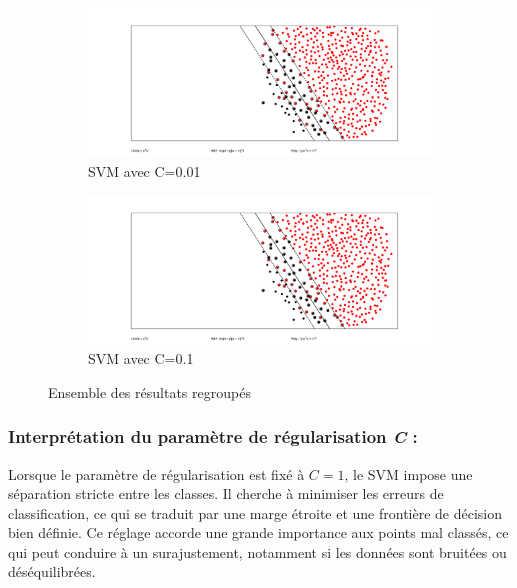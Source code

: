 \documentclass[12pt,a4paper]{report}
\begin{document}
\begin{figure}[H]
    \begin{subfigure}{0.45\linewidth}
        \centering
        \includegraphics[width=\linewidth]{images/c0.01.png}
        \caption{SVM avec C=0.01}
        \label{fig:c001}
    \end{subfigure}
    \hfill
    \begin{subfigure}{0.45\linewidth}
        \centering
        \includegraphics[width=\linewidth]{images/c0.1.png}
        \caption{SVM avec C=0.1}
        \label{fig:c01}
    \end{subfigure}
    
    \caption{Ensemble des résultats regroupés}
    \label{fig:all_results}
\end{figure}

\subsubsection*{Interprétation du paramètre de régularisation \textit{C} :}

Lorsque le paramètre de régularisation est fixé à $C = 1$, le SVM impose une séparation stricte entre les classes. Il cherche à minimiser les erreurs de classification, ce qui se traduit par une marge étroite et une frontière de décision bien définie. Ce réglage accorde une grande importance aux points mal classés, ce qui peut conduire à un surajustement, notamment si les données sont bruitées ou déséquilibrées.
\end{document}
